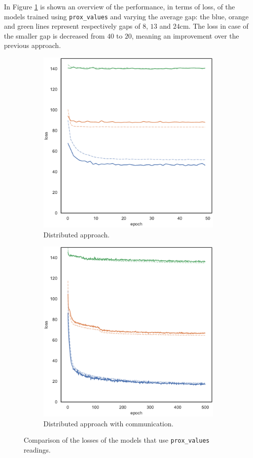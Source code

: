 In Figure \ref{fig:commlossprox_values} is shown an overview of the performance, 
in terms of loss, of the models trained using \texttt{prox\_values} and varying the 
average gap: the blue, orange and green lines represent respectively gaps of $8$, 
$13$ and $24$\gls{cm}.
The loss in case of the smaller gap is decreased from $40$ to $20$, meaning an 
improvement over the previous approach.
\begin{figure}[!htb]
	\begin{center}
		\begin{subfigure}[h]{0.49\textwidth}
			\centering
			\includegraphics[width=.65\textwidth]{contents/images/task1-comm/loss-distributed-prox_values@copy}
			\caption{Distributed approach.}
		\end{subfigure}
		\hfill
		\begin{subfigure}[h]{0.49\textwidth}
			\centering
			\includegraphics[width=.7\textwidth]{contents/images/task1-comm/loss-communication-prox_values@copy}
			\caption{Distributed approach with communication.}
		\end{subfigure}	
	\end{center}
\vspace{-0.5cm}
	\caption{Comparison of the losses of the models that use \texttt{prox\_values} 
		readings.}
	\label{fig:commlossprox_values}
\end{figure}

